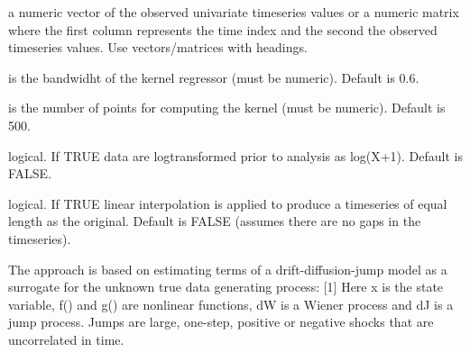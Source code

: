 \documentclass[a4paper]{book}
\begin{document}
%
\begin{Arguments}
\begin{ldescription}
\item[\code{timeseries}] a numeric vector of the observed
univariate timeseries values or a numeric matrix where
the first column represents the time index and the second
the observed timeseries values. Use vectors/matrices with
headings.

\item[\code{bandwidth}] is the bandwidht of the kernel regressor
(must be numeric). Default is 0.6.

\item[\code{na}] is the number of points for computing the
kernel (must be numeric). Default is 500.

\item[\code{logtransform}] logical. If TRUE data are
logtransformed prior to analysis as log(X+1). Default is
FALSE.

\item[\code{interpolate}] logical. If TRUE linear interpolation
is applied to produce a timeseries of equal length as the
original. Default is FALSE (assumes there are no gaps in
the timeseries).
\end{ldescription}
\end{Arguments}
%
\begin{Details}\relax
The approach is based on estimating terms of a
drift-diffusion-jump model as a surrogate for the unknown
true data generating process: [1]  Here x is the state variable, f()
and g() are nonlinear functions, dW is a Wiener process
and dJ is a jump process. Jumps are large, one-step,
positive or negative shocks that are uncorrelated in
time.
\end{Details}
%
\end{document}

